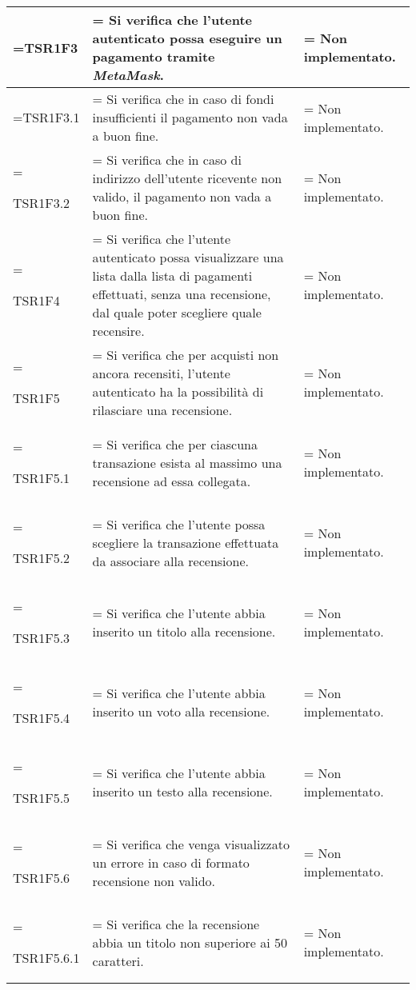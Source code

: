 \begin{xltabular}{\textwidth} {
        >{\hsize\linewidth=\hsize}X
        >{\hsize\linewidth=\hsize}X
        >{\hsize\linewidth=\hsize}X
    }
    TSR1F3&
    Si verifica che l'utente autenticato possa eseguire un pagamento tramite \textit{MetaMask}. &
    Non implementato.
    \\ \hline
    
    TSR1F3.1&
    Si verifica che in caso di fondi insufficienti il pagamento non vada a buon fine.&
    Non implementato.
    \\ \hline
    
    TSR1F3.2&
    Si verifica che in caso di indirizzo dell'utente ricevente non valido, il pagamento non vada a buon fine.&
    Non implementato.
    \\ \hline
    
    TSR1F4&
    Si verifica che l'utente autenticato possa visualizzare una lista dalla lista di pagamenti effettuati, senza una recensione, dal quale poter scegliere quale recensire.&
    Non implementato.
    \\ \hline

    TSR1F5&
    Si verifica che per acquisti non ancora recensiti, l'utente autenticato ha la possibilità di rilasciare una recensione.&
    Non implementato.
    \\ \hline

    TSR1F5.1&
    Si verifica che per ciascuna transazione esista al massimo una recensione ad essa collegata.&
    Non implementato.
    \\ \hline
    
    TSR1F5.2&
    Si verifica che l'utente possa scegliere la transazione effettuata da associare alla recensione.&
    Non implementato.
    \\ \hline

    TSR1F5.3&
    Si verifica che l'utente abbia inserito un titolo alla recensione.&
    Non implementato.
    \\ \hline

    TSR1F5.4&
    Si verifica che l'utente abbia inserito un voto alla recensione.&
    Non implementato.
    \\ \hline

    TSR1F5.5&
    Si verifica che l'utente abbia inserito un testo alla recensione.&
    Non implementato.
    \\ \hline

    TSR1F5.6&
    Si verifica che venga visualizzato un errore in caso di formato recensione non valido.&
    Non implementato.
    \\ \hline
    
    TSR1F5.6.1&
    Si verifica che la recensione abbia un titolo non superiore ai 50 caratteri.&
    Non implementato.
    \\ \hline


\end{xltabular}
